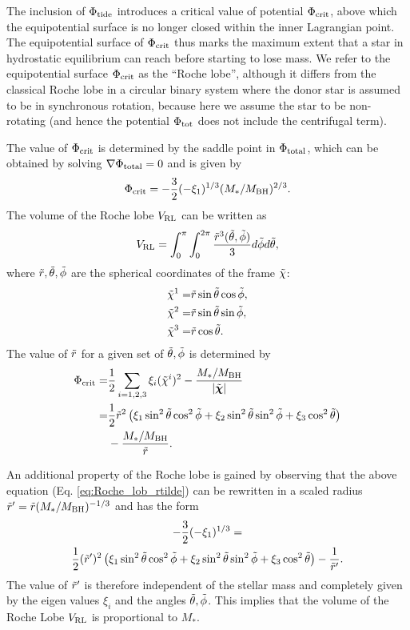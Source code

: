 \documentclass[useAMS,usenatbib]{mn2e}
\def\mstar{M_*}
\def\mBH{M_{\rm BH}}
\def\VRL{V_{\rm RL}}
\def\tr{\Tilde{r}}
\def\ttheta{\Tilde{\theta}}
\def\tphi{\Tilde{\phi}}
\newcommand{\lrb}[1]{\left({#1}\right)}
\newcommand{\abs}[1]{\left|#1\right|}
\begin{document}
The inclusion of $\Phi_{\rm tide}$ introduces a critical value of potential $\Phi_{\rm crit}$, above which the equipotential surface is no longer closed within the inner Lagrangian point.
The equipotential surface of $\Phi_{\rm crit}$ thus marks the maximum extent that a star in hydrostatic equilibrium can reach before starting to lose mass.
We refer to the equipotential surface $\Phi_{\rm crit}$ as the ``Roche lobe'', although it differs from the classical Roche lobe in a circular binary system where the donor star is assumed to be in synchronous rotation, because here we assume the star to be non-rotating (and hence the potential $\Phi_{\rm tot}$ does not include the centrifugal term).

The value of $\Phi_{\rm crit}$ is determined by the saddle point in $\Phi_{\rm total}$, which can be obtained by solving $\nabla\Phi_{\rm total}=0$ and is given by
\begin{equation}
    \Phi_{\rm crit}=-\frac{3}{2}(-\xi_1)^{1/3}(\mstar/\mBH)^{2/3}.
\end{equation}
The volume of the Roche lobe $\VRL$ can be written as
\begin{equation}
    \VRL=\int_0^{\pi}\int_0^{2\pi}\frac{\tr^3(\ttheta,\tphi)}{3}d\tphi d\ttheta,
\end{equation}
where $\tr,\ttheta,\tphi$ are the spherical coordinates of the frame $\Tilde{\chi}$:
\begin{align}
    \Tilde{\chi}^1 = & \tr\sin\ttheta\cos\tphi, \\
    \Tilde{\chi}^2 = & \tr\sin\ttheta\sin\tphi, \\
    \Tilde{\chi}^3 = & \tr\cos\ttheta.
\end{align}
The value of $\tr$ for a given set of $\ttheta,\tphi$ is determined by
\begin{align}
\label{eq:Roche_lob_rtilde}
    \Phi_{\rm crit} = & \frac{1}{2}\sum_{i=1,2,3}\xi_i(\Tilde{\chi}^i)^2-\frac{\mstar/\mBH}{\abs{\Tilde{\boldsymbol{\chi}}}}\nonumber\\
                    = & \frac{1}{2} \tr^2\lrb{\xi_1\sin^2\ttheta\cos^2\tphi+\xi_2\sin^2\ttheta\sin^2\tphi+\xi_3\cos^2\ttheta}\nonumber\\
                      & - \frac{\mstar/\mBH}{\tr}.
\end{align}

An additional property of the Roche lobe is gained by observing that the above equation (Eq. \ref{eq:Roche_lob_rtilde}) can be rewritten in a scaled radius $\tr^{\prime}=\tr(\mstar/\mBH)^{-1/3}$ and has the form
\begin{multline}
    -\frac{3}{2}(-\xi_1)^{1/3}=\\
    \frac{1}{2} (\tr^{\prime})^2\lrb{\xi_1\sin^2\ttheta\cos^2\tphi+\xi_2\sin^2\ttheta\sin^2\tphi+\xi_3\cos^2\ttheta}-\frac{1}{\tr'}.
\end{multline}
The value of $\tr^{\prime}$ is therefore independent of the stellar mass and completely given by the eigen values $\xi_i$ and the angles $\ttheta,\tphi$.
This implies that the volume of the Roche Lobe $\VRL$ is proportional to $\mstar$.
\end{document}
